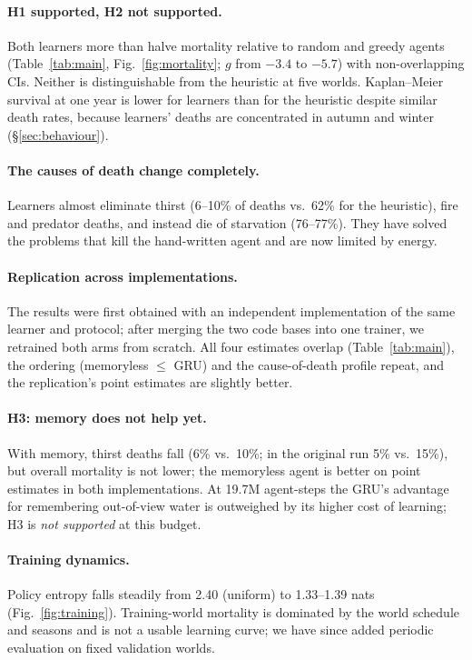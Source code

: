\documentclass[10pt]{article}
\begin{document}
\paragraph{H1 supported, H2 not supported.} Both learners more than halve mortality relative to random and greedy
agents (Table~\ref{tab:main}, Fig.~\ref{fig:mortality}; $g$ from $-3.4$ to $-5.7$) with non-overlapping CIs. Neither
is distinguishable from the heuristic at five worlds. Kaplan--Meier survival at one year is lower for learners than
for the heuristic despite similar death rates, because learners' deaths are concentrated in autumn and winter
(\S\ref{sec:behaviour}).

\paragraph{The causes of death change completely.} Learners almost eliminate thirst (6--10\% of deaths vs.\ 62\% for
the heuristic), fire and predator deaths, and instead die of starvation (76--77\%). They have solved the problems
that kill the hand-written agent and are now limited by energy.

\paragraph{Replication across implementations.} The results were first obtained with an independent implementation
of the same learner and protocol; after merging the two code bases into one trainer, we retrained both arms from
scratch. All four estimates overlap (Table~\ref{tab:main}), the ordering (memoryless $\leq$ GRU) and the
cause-of-death profile repeat, and the replication's point estimates are slightly better.

\paragraph{H3: memory does not help yet.} With memory, thirst deaths fall (6\% vs.\ 10\%; in the original run 5\%
vs.\ 15\%), but overall mortality is not lower; the memoryless agent is better on point estimates in both
implementations. At 19.7M agent-steps the GRU's advantage for remembering out-of-view water is outweighed by its
higher cost of learning; H3 is \emph{not supported} at this budget.

\paragraph{Training dynamics.} Policy entropy falls steadily from 2.40 (uniform) to 1.33--1.39 nats
(Fig.~\ref{fig:training}). Training-world mortality is dominated by the world schedule and seasons and is not a
usable learning curve; we have since added periodic evaluation on fixed validation worlds.
\end{document}
